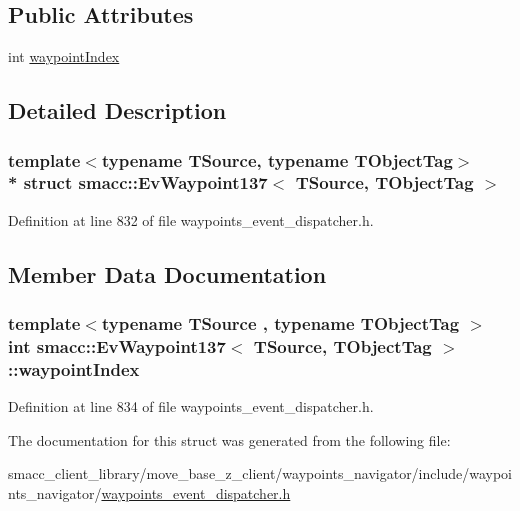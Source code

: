 \subsection*{Public Attributes}
\begin{DoxyCompactItemize}
\item 
int \hyperlink{structsmacc_1_1EvWaypoint137_af5d688f434f4de13598ef58294d9eed0}{waypoint\+Index}
\end{DoxyCompactItemize}


\subsection{Detailed Description}
\subsubsection*{template$<$typename T\+Source, typename T\+Object\+Tag$>$\\*
struct smacc\+::\+Ev\+Waypoint137$<$ T\+Source, T\+Object\+Tag $>$}



Definition at line 832 of file waypoints\+\_\+event\+\_\+dispatcher.\+h.



\subsection{Member Data Documentation}
\subsubsection[{\texorpdfstring{waypoint\+Index}{waypointIndex}}]{\setlength{\rightskip}{0pt plus 5cm}template$<$typename T\+Source , typename T\+Object\+Tag $>$ int {\bf smacc\+::\+Ev\+Waypoint137}$<$ T\+Source, T\+Object\+Tag $>$\+::waypoint\+Index}\hypertarget{structsmacc_1_1EvWaypoint137_af5d688f434f4de13598ef58294d9eed0}{}\label{structsmacc_1_1EvWaypoint137_af5d688f434f4de13598ef58294d9eed0}


Definition at line 834 of file waypoints\+\_\+event\+\_\+dispatcher.\+h.



The documentation for this struct was generated from the following file\+:\begin{DoxyCompactItemize}
\item 
smacc\+\_\+client\+\_\+library/move\+\_\+base\+\_\+z\+\_\+client/waypoints\+\_\+navigator/include/waypoints\+\_\+navigator/\hyperlink{waypoints__event__dispatcher_8h}{waypoints\+\_\+event\+\_\+dispatcher.\+h}\end{DoxyCompactItemize}
